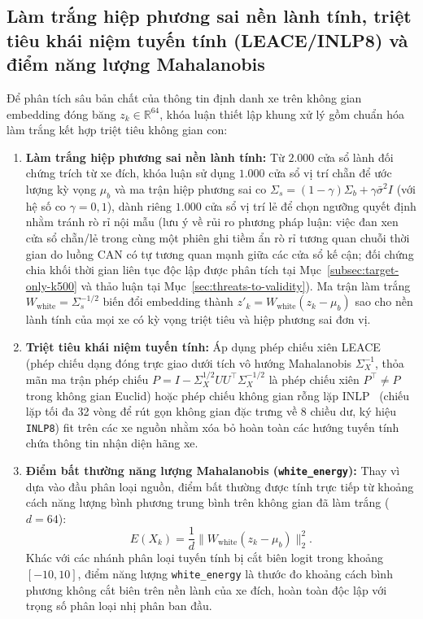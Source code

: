 \documentclass[12pt, a4paper, reqno, oneside]{book}
\DeclareRobustCommand{\code}[1]{\nolinkurl{#1}}
\begin{document}
\subsection[Làm trắng nền lành tính, xóa tuyến tính và năng lượng Mahalanobis]{Làm trắng hiệp phương sai nền lành tính, triệt tiêu khái niệm tuyến tính (LEACE/INLP8) và điểm năng lượng Mahalanobis}\label{subsec:method-whitening}
Để phân tích sâu bản chất của thông tin định danh xe trên không gian embedding đóng băng $z_k \in \mathbb{R}^{64}$, khóa luận thiết lập khung xử lý gồm chuẩn hóa làm trắng kết hợp triệt tiêu không gian con:
\begin{enumerate}
    \item \textbf{Làm trắng hiệp phương sai nền lành tính:} Từ $2.000$ cửa sổ lành đối chứng trích từ xe đích, khóa luận sử dụng $1.000$ cửa sổ vị trí chẵn để ước lượng kỳ vọng $\mu_b$ và ma trận hiệp phương sai co $\Sigma_s = (1-\gamma)\Sigma_b + \gamma \bar{\sigma}^2 I$ (với hệ số co $\gamma = 0{,}1$), dành riêng $1.000$ cửa sổ vị trí lẻ để chọn ngưỡng quyết định nhằm tránh rò rỉ nội mẫu (lưu ý về rủi ro phương pháp luận: việc đan xen cửa sổ chẵn/lẻ trong cùng một phiên ghi tiềm ẩn rò rỉ tương quan chuỗi thời gian do luồng CAN có tự tương quan mạnh giữa các cửa sổ kế cận; đối chứng chia khối thời gian liên tục độc lập được phân tích tại Mục~\ref{subsec:target-only-k500} và thảo luận tại Mục~\ref{sec:threats-to-validity}). Ma trận làm trắng $W_{\text{white}} = \Sigma_s^{-1/2}$ biến đổi embedding thành $z'_k = W_{\text{white}}(z_k - \mu_b)$ sao cho nền lành tính của mọi xe có kỳ vọng triệt tiêu và hiệp phương sai đơn vị.
    \item \textbf{Triệt tiêu khái niệm tuyến tính:} Áp dụng phép chiếu xiên LEACE~\cite{belrose2023leace} (phép chiếu dạng đóng trực giao dưới tích vô hướng Mahalanobis $\Sigma_X^{-1}$, thỏa mãn ma trận phép chiếu $P = I - \Sigma_X^{1/2}UU^\top\Sigma_X^{-1/2}$ là phép chiếu xiên $P^\top \neq P$ trong không gian Euclid) hoặc phép chiếu không gian rỗng lặp INLP~\cite{ravfogel2020null} (chiếu lặp tối đa 32 vòng để rút gọn không gian đặc trưng về $8$ chiều dư, ký hiệu \code{INLP8}) fit trên các xe nguồn nhằm xóa bỏ hoàn toàn các hướng tuyến tính chứa thông tin nhận diện hãng xe.
    \item \textbf{Điểm bất thường năng lượng Mahalanobis (\code{white\_energy}):} Thay vì dựa vào đầu phân loại nguồn, điểm bất thường được tính trực tiếp từ khoảng cách năng lượng bình phương trung bình trên không gian đã làm trắng ($d=64$):
    \begin{equation}
    E(X_k) = \frac{1}{d} \| W_{\text{white}} (z_k - \mu_b) \|_2^2.
    \end{equation}
    Khác với các nhánh phân loại tuyến tính bị cắt biên logit trong khoảng $[-10, 10]$, điểm năng lượng \code{white\_energy} là thước đo khoảng cách bình phương không cắt biên trên nền lành của xe đích, hoàn toàn độc lập với trọng số phân loại nhị phân ban đầu.
\end{enumerate}
\end{document}
